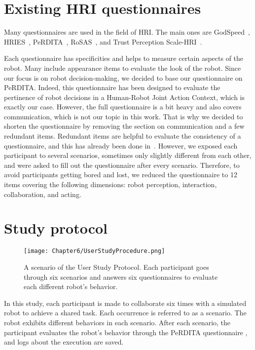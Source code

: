 \section{Existing HRI questionnaires}

Many questionnaires are used in the field of HRI. The main ones are GodSpeed~\cite{bartneck_measurement_2009}, HRIES~\cite{spatola_perception_2021}, PeRDITA~\cite{devin_evaluating_2018}, RoSAS~\cite{carpinella_robotic_2017}, and Trust Perception Scale-HRI~\cite{mittu_measuring_2016}. 

Each questionnaire has specificities and helps to measure certain aspects of the robot. Many include appearance items to evaluate the look of the robot. Since our focus is on robot decision-making, we decided to base our questionnaire on PeRDITA. Indeed, this questionnaire has been designed to evaluate the pertinence of robot decisions in a Human-Robot Joint Action Context, which is exactly our case. However, the full questionnaire is a bit heavy and also covers communication, which is not our topic in this work. 
That is why we decided to shorten the questionnaire by removing the section on communication and a few redundant items. Redundant items are helpful to evaluate the consistency of a questionnaire, and this has already been done in~\cite{devin_evaluating_2018}. 
However, we exposed each participant to several scenarios, sometimes only slightly different from each other, and were asked to fill out the questionnaire after every scenario. Therefore, to avoid participants getting bored and lost, we reduced the questionnaire to 12 items covering the following dimensions: robot perception, interaction, collaboration, and acting.


\section{Study protocol} \label{sec:study_protocol}

\begin{figure}
    \centering
    \texttt{[image: Chapter6/UserStudyProcedure.png]}
    \caption{A scenario of the User Study Protocol. Each participant goes through six scenarios and answers six questionnaires to evaluate each different robot's behavior.}
    \label{fig:user_study_protocol}
\end{figure}


In this study, each participant is made to collaborate six times with a simulated robot to achieve a shared task. Each occurrence is referred to as a scenario. The robot exhibits different behaviors in each scenario. After each scenario, the participant evaluates the robot's behavior through the PeRDITA questionnaire \cite{devin_evaluating_2018}, and logs about the execution are saved.

